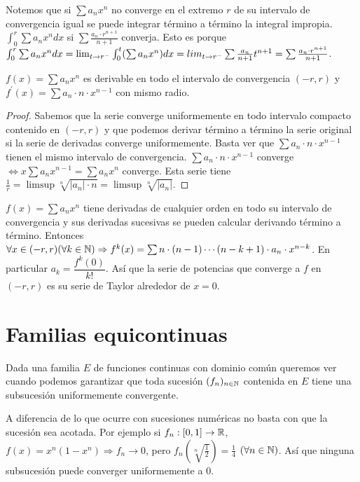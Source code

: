 Notemos que si \(\sum a_n x^n\) no converge en el extremo \(r\) de su intervalo de convergencia igual se puede integrar término a término la integral impropia. \(\int_0^r \sum a_n x^n dx\) si \(\sum \frac{a_n \cdot r^{n+1}}{n+1}\) converja.
Esto es porque \(\int_0^r \sum a_n x^n dx = \lim_{t \to r^-} \int_0^t (\sum a_n x^n) dx = \\lim_{t \to r^-} \sum \frac{a_n}{n+1} t^{n+1} = \sum \frac{a_n \cdot r^{n+1}}{n+1}\).

\begin{theorem}
  \(f(x) = \sum a_n x^n\) es derivable en todo el intervalo de convergencia \((-r, r)\) y \(f^{\prime}(x) = \sum a_n \cdot n \cdot x^{n-1}\) con mismo radio.
  \begin{proof}
    Sabemos que la serie converge uniformemente en todo intervalo compacto contenido en \((-r, r)\) y que podemos derivar término a término la serie original si la serie de derivadas converge uniformemente.
    Basta ver que \(\sum a_n \cdot n \cdot x^{n-1}\) tienen el mismo intervalo de convergencia. \(\sum a_n \cdot n \cdot x^{n-1}\) converge \(\iff x \sum a_n x^{n-1} = \sum a_n x^n\) converge. Esta serie tiene \(\frac{1}{r} = \limsup \sqrt[n]{|a_n| \cdot n} = \limsup \sqrt[n]{|a_n|}\).
  \end{proof}
\end{theorem}

\begin{corollary}
  \(f(x) = \sum a_n x^n\) tiene derivadas de cualquier orden en todo su intervalo de convergencia y sus derivadas sucesivas se pueden calcular derivando término a término. Entonces \(\forall x \in (-r, r)(\forall k \in \mathbb{N}) \Rightarrow f^k(x) = \sum n \cdot (n-1) \cdots (n-k+1) \cdot a_n \cdot x^{n-k}\).
  En particular \(a_k = \dfrac{f^k(0)}{k!}\). Así que la serie de potencias que converge a \(f\) en \((-r, r)\) es su serie de Taylor alrededor de \(x = 0\).
\end{corollary}

\section{Familias equicontinuas}

Dada una familia \(E\) de funciones continuas con dominio común queremos ver cuando podemos garantizar que toda sucesión \((f_n)_{n \in \mathbb{N}}\) contenida en \(E\) tiene una subsucesión uniformemente convergente.

A diferencia de lo que ocurre con sucesiones numéricas no basta con que la sucesión sea acotada. Por ejemplo si \(f_n: [0, 1] \to \mathbb{R}\), \(f(x) = x^n(1 - x^n) \Rightarrow f_n \to 0\), pero \(f_n(\sqrt[n]{\frac{1}{2}}) = \frac{1}{4}\) \((\forall n \in \mathbb{N})\).
Así que ninguna subsucesión puede converger uniformemente a \(0\).

